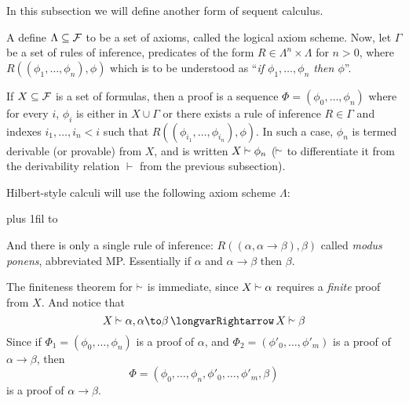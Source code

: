 In this subsection we will define another form of sequent calculus.

\bdefn

    A define $\Lambda\subseteq{\cal F}$ to be a set of axioms, called the {\emphcolor logical axiom scheme}.
    Now, let $\Gamma$ be a set of {\emphcolor rules of inference}, predicates of the form $R\in\Lambda^n\times\Lambda$ for $n>0$, where $R((\phi_1,\dots,\phi_n),\phi)$ which is to be understood as
    ``{\it if $\phi_1,\dots,\phi_n$ then $\phi$}''.

    If $X\subseteq{\cal F}$ is a set of formulas, then a {\emphcolor proof} is a sequence $\Phi=(\phi_0,\dots,\phi_n)$ where for every $i$, $\phi_i$ is either in $X\cup\Gamma$ or there
    exists a rule of inference $R\in\Gamma$ and indexes $i_1,\dots,i_n<i$ such that $R((\phi_{i_1},\dots,\phi_{i_n}),\phi)$.
    In such a case, $\phi_n$ is termed {\emphcolor derivable} (or {\emphcolor provable}) from $X$, and is written $X\vsim\phi_n$ ($\vsim$ to differentiate it from the derivability relation $\vdash$ from
    the previous subsection).

\edefn

Hilbert-style calculi will use the following axiom scheme $\Lambda$:

\medskip
\tabskip=0pt plus 1fil
\halign to 

And there is only a single rule of inference: $R((\alpha,\alpha\to\beta),\beta)$ called {\it modus ponens}, abbreviated MP.
Essentially if $\alpha$ and $\alpha\to\beta$ then $\beta$.

The finiteness theorem for $\vsim$ is immediate, since $X\vsim\alpha$ requires a {\it finite} proof from $X$.
And notice that
$$ X\vsim\alpha,\alpha\to\beta \implies X\vsim\beta $$
Since if $\Phi_1=(\phi_0,\dots,\phi_n)$ is a proof of $\alpha$, and $\Phi_2=(\phi'_0,\dots,\phi'_m)$ is a proof of $\alpha\to\beta$, then
$$ \Phi=(\phi_0,\dots,\phi_n,\phi'_0,\dots,\phi'_m,\beta) $$
is a proof of $\alpha\to\beta$.


